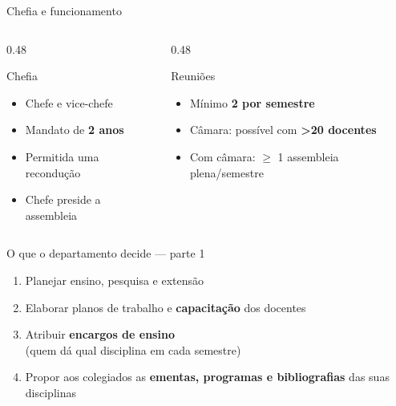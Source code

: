\documentclass[aspectratio=169]{beamer}
\newcommand{\impt}[1]{\textcolor{maccent}{\textbf{#1}}}
\newcommand{\ntc}[1]{\textcolor{mprimary}{#1}}
\begin{document}
\begin{frame}{Chefia e funcionamento}
  \begin{columns}[T,onlytextwidth]
    \begin{column}{0.48\textwidth}
      \begin{block}{Chefia}
        \begin{itemize}
          \item Chefe e vice-chefe
          \item Mandato de \impt{2 anos}
          \item Permitida uma recondução
          \item Chefe preside a assembleia
        \end{itemize}
      \end{block}
    \end{column}
    \begin{column}{0.48\textwidth}
      \begin{block}{Reuniões}
        \begin{itemize}
          \item Mínimo \impt{2 por semestre}
          \item Câmara: possível com \impt{>20 docentes}
          \item Com câmara: $\geq$ 1 assembleia plena/semestre
        \end{itemize}
      \end{block}
    \end{column}
  \end{columns}
\end{frame}

\begin{frame}{O que o departamento decide --- parte 1}
  \begin{enumerate}
    \item Planejar ensino, pesquisa e extensão
    \item Elaborar planos de trabalho e \impt{capacitação} dos docentes
    \item Atribuir \impt{encargos de ensino} \\
          \ntc{(quem dá qual disciplina em cada semestre)}
    \item Propor aos colegiados as \impt{ementas, programas e bibliografias} das suas disciplinas
  \end{enumerate}
\end{frame}
\end{document}
